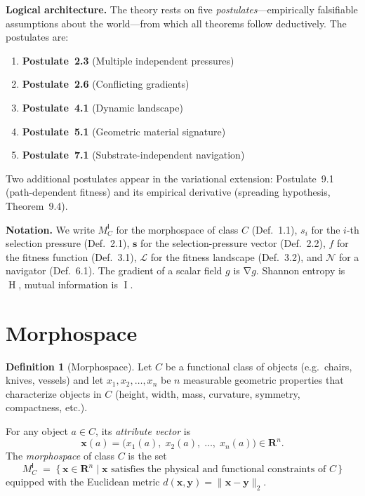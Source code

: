 \documentclass[10pt]{article}
\theoremstyle{definition}
\newtheorem{definition}{Definition}[section]
\theoremstyle{plain}
\theoremstyle{remark}
\newcommand{\MC}{M^{\mathsf{I}}_C}          %
\providecommand{\Rn}{}
\renewcommand{\Rn}{\mathbf{R}^n}            %
\newcommand{\FitLand}{\mathcal{L}}           %
\newcommand{\Nav}{\mathcal{N}}               %
\newcommand{\norm}[1]{\lVert #1 \rVert}
\DeclareMathOperator{\grad}{\nabla}
\DeclareMathOperator{\MI}{I}                 %
\DeclareMathOperator{\Ent}{H}                %
\begin{document}
\medskip\noindent\textbf{Logical architecture.}
The theory rests on five \emph{postulates}---empirically falsifiable
assumptions about the world---from which all theorems follow deductively.
The postulates are:
\begin{enumerate}[nosep]
  \item \textbf{Postulate~2.3}\; (Multiple independent pressures)
  \item \textbf{Postulate~2.6}\; (Conflicting gradients)
  \item \textbf{Postulate~4.1}\; (Dynamic landscape)
  \item \textbf{Postulate~5.1}\; (Geometric material signature)
  \item \textbf{Postulate~7.1}\; (Substrate-independent navigation)
\end{enumerate}
Two additional postulates appear in the variational extension:
Postulate~9.1 (path-dependent fitness) and its empirical derivative
(spreading hypothesis, Theorem~9.4).

\medskip\noindent\textbf{Notation.}
We write $\MC$ for the morphospace of class $C$ (Def.~1.1),
$s_i$ for the $i$-th selection pressure (Def.~2.1),
$\bm{s}$ for the selection-pressure vector (Def.~2.2),
$f$ for the fitness function (Def.~3.1),
$\FitLand$ for the fitness landscape (Def.~3.2),
and $\Nav$ for a navigator (Def.~6.1).
The gradient of a scalar field $g$ is $\grad g$.
Shannon entropy is $\Ent$, mutual information is $\MI$.

\newpage
\section{Morphospace}\label{sec:morphospace}

\begin{definition}[Morphospace]\label{def:1.1}
Let $C$ be a functional class of objects (e.g.\ chairs, knives, vessels)
and let $x_1, x_2, \ldots, x_n$ be $n$ measurable geometric properties
that characterize objects in $C$ (height, width, mass, curvature,
symmetry, compactness, etc.).

For any object $a \in C$, its \emph{attribute vector} is
\[
  \bm{x}(a) = \bigl(x_1(a),\; x_2(a),\; \ldots,\; x_n(a)\bigr) \in \Rn.
\]
The \emph{morphospace} of class $C$ is the set
\[
  \MC \;=\; \bigl\{\, \bm{x} \in \Rn
    \;\big|\; \bm{x} \text{ satisfies the physical and functional
    constraints of } C \,\bigr\}
\]
equipped with the Euclidean metric $d(\bm{x}, \bm{y}) = \norm{\bm{x} - \bm{y}}_2$.
\end{definition}
\end{document}
